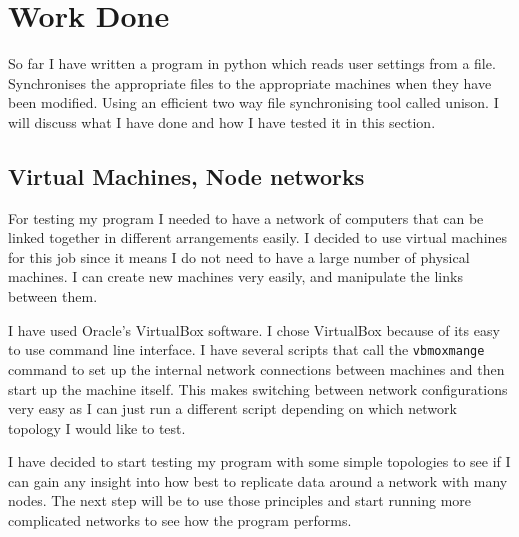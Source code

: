 \documentclass[12pt]{article}
\begin{document}

\section{Work Done}
So far I have written a program in python which reads user
settings from a file. Synchronises the appropriate files
to the appropriate machines when they have been modified.
Using an efficient two way file synchronising tool called
unison. I will discuss what I have done and how I have tested
it in this section.

\subsection{Virtual Machines, Node networks}
For testing my program I needed to have a network
of computers that can be linked together in different
arrangements easily. I decided to use virtual machines for
this job since it means I do not need to have a large number
of physical machines.  I can create new machines very easily, and manipulate the
links between them.

I have used Oracle's VirtualBox software. I chose
VirtualBox because of its easy to use command
line interface. I have several scripts that
call the \texttt{vbmoxmange} command to set up the internal
network connections between machines and then start up
the machine itself. This makes switching between
network configurations very easy as I can just
run a different script depending on which network
topology I would like to test.

I have decided to start testing my program with
some simple topologies to see if I can gain any
insight into how best to replicate data around
a network with many nodes. The next step will
be to use those principles and start running
more complicated networks to see how the program
performs.
\end{document}
